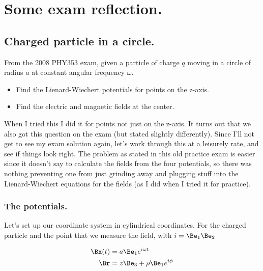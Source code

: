 
%

\chapter{Some exam reflection.}
\label{chap:relativisticElectrodynamicsExamReflection}
{}
\date{April 13, 2011}

\beginArtWithToc

\section{Charged particle in a circle.}

From the 2008 PHY353 exam, given a particle of charge $q$ moving in a circle of radius $a$ at constant angular frequency $\omega$.

\begin{itemize}
\item Find the Lienard-Wiechert potentials for points on the z-axis.
\item Find the electric and magnetic fields at the center.
\end{itemize}

When I tried this I did it for points not just on the z-axis.  It turns out that we also got this question on the exam (but stated slightly differently).  Since I'll not get to see my exam solution again, let's work through this at a leisurely rate, and see if things look right.  The problem as stated in this old practice exam is easier since it doesn't say to calculate the fields from the four potentials, so there was nothing preventing one from just grinding away and plugging stuff into the Lienard-Wiechert equations for the fields (as I did when I tried it for practice).

\subsection{The potentials.}

Let's set up our coordinate system in cylindrical coordinates.  For the charged particle and the point that we measure the field, with $i = \Be_1 \Be_2$

\begin{align}\label{eqn:relativisticElectrodynamicsExamReflection:10}
\Bx(t) &= a \Be_1 e^{i \omega t} \\
\Br &= z \Be_3 + \rho \Be_1 e^{i \phi}
\end{align}

